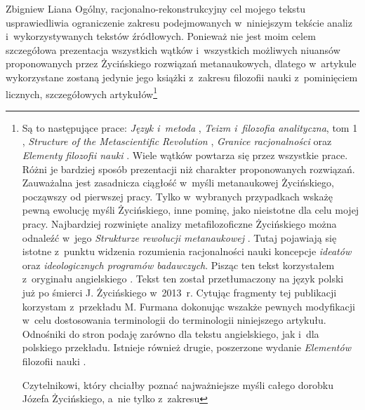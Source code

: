 \begin{artplenv}{Zbigniew Liana}
Ogólny, racjonalno-rekonstrukcyjny cel mojego tekstu usprawiedliwia ograniczenie zakresu podejmowanych w~niniejszym
tekście analiz i~wykorzystywanych tekstów źródłowych. Ponieważ nie jest moim celem szczegółowa prezentacja wszystkich
wątków i~wszystkich możliwych niuansów proponowanych przez Życińskiego rozwiązań metanaukowych, dlatego w~artykule
wykorzystane zostaną jedynie jego książki z~zakresu filozofii nauki z~pominięciem licznych, szczegółowych
artykułów\footnote{Są to następujące prace: \textit{Język i~metoda}
\parencite*{zycinski_jezyk_1983},
\textit{Teizm i~filozofia analityczna}, tom 1
\parencite*{zycinski_teizm_1985},
\textit{Structure of the Metascientific Revolution}
\parencite*{zycinski_structure_1988},
\textit{Granice racjonalności}
\parencite*{zycinski_granice_1993}
oraz \textit{Elementy filozofii nauki}
\parencite*{zycinski_elementy_1996}.
Wiele wątków powtarza się przez wszystkie prace. Różni je bardziej
sposób prezentacji niż charakter proponowanych rozwiązań. Zauważalna jest zasadnicza ciągłość w~myśli metanaukowej
Życińskiego, począwszy od pierwszej pracy. Tylko w~wybranych przypadkach wskażę pewną ewolucję myśli Życińskiego, inne
pominę, jako nieistotne dla celu mojej pracy. Najbardziej rozwinięte analizy metafilozoficzne Życińskiego można
odnaleźć w~jego \textit{Strukturze rewolucji metanaukowej}
\parencite*{zycinski_structure_1988,zycinski_struktura_2013}.
Tutaj pojawiają się
istotne z~punktu widzenia rozumienia racjonalności nauki koncepcje \textit{ideatów} oraz \textit{ideologicznych programów
badawczych}. Pisząc ten tekst korzystałem z~oryginału angielskiego
\parencite{zycinski_structure_1988}.
Tekst
ten został przetłumaczony na język polski już po śmierci J. Życińskiego w~2013~r. Cytując fragmenty tej publikacji
korzystam z~przekładu M. Furmana dokonując wszakże pewnych modyfikacji w~celu dostosowania terminologii do terminologii
niniejszego artykułu. Odnośniki do stron podaję zarówno dla tekstu angielskiego, jak i~dla polskiego przekładu.
Istnieje również drugie, poszerzone wydanie \textit{Elementów} filozofii nauki
\parencite{zycinski_elementy_2015}. \par
Czytelnikowi, który chciałby poznać najważniejsze myśli całego dorobku Józefa Życińskiego, a~nie tylko z~zakresu
}
\end{artplenv}
